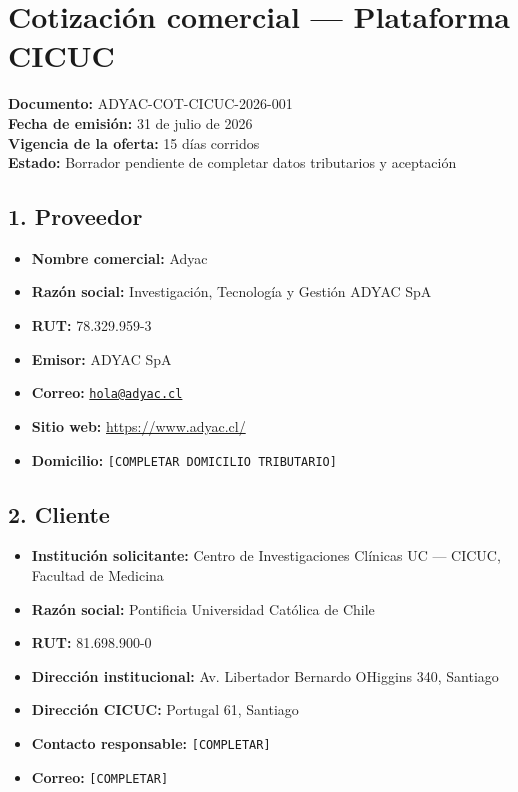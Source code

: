 \documentclass[
]{article}
\author{}
\date{}
\providecommand{\tightlist}{%
  \setlength{\itemsep}{0pt}\setlength{\parskip}{0pt}}
\begin{document}
\hypertarget{cotizaciuxf3n-comercial--plataforma-cicuc}{%
\section{Cotización comercial --- Plataforma
CICUC}\label{cotizaciuxf3n-comercial--plataforma-cicuc}}

\textbf{Documento:} ADYAC-COT-CICUC-2026-001\\
\textbf{Fecha de emisión:} 31 de julio de 2026\\
\textbf{Vigencia de la oferta:} 15 días corridos\\
\textbf{Estado:} Borrador pendiente de completar datos tributarios y
aceptación

\hypertarget{1-proveedor}{%
\subsection{1. Proveedor}\label{1-proveedor}}

\begin{itemize}
\tightlist
\item
  \textbf{Nombre comercial:} Adyac
\item
  \textbf{Razón social:} Investigación, Tecnología y Gestión ADYAC SpA
\item
  \textbf{RUT:} 78.329.959-3
\item
  \textbf{Emisor:} ADYAC SpA
\item
  \textbf{Correo:}
  \href{mailto:hola@adyac.cl}{\nolinkurl{hola@adyac.cl}}
\item
  \textbf{Sitio web:}
  \href{https://www.adyac.cl/}{\url{https://www.adyac.cl/}}
\item
  \textbf{Domicilio:} \texttt{{[}COMPLETAR\ DOMICILIO\ TRIBUTARIO{]}}
\end{itemize}

\hypertarget{2-cliente}{%
\subsection{2. Cliente}\label{2-cliente}}

\begin{itemize}
\tightlist
\item
  \textbf{Institución solicitante:} Centro de Investigaciones Clínicas
  UC --- CICUC, Facultad de Medicina
\item
  \textbf{Razón social:} Pontificia Universidad Católica de Chile
\item
  \textbf{RUT:} 81.698.900-0
\item
  \textbf{Dirección institucional:} Av. Libertador Bernardo
  O\textquotesingle Higgins 340, Santiago
\item
  \textbf{Dirección CICUC:} Portugal 61, Santiago
\item
  \textbf{Contacto responsable:} \texttt{{[}COMPLETAR{]}}
\item
  \textbf{Correo:} \texttt{{[}COMPLETAR{]}}
\end{itemize}
\end{document}
